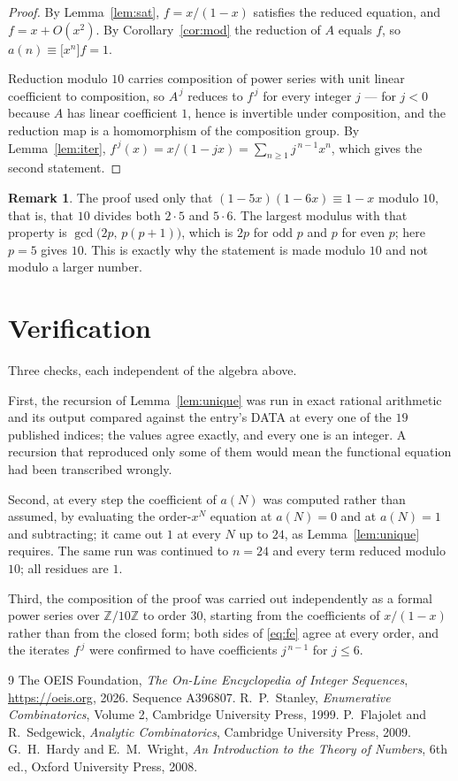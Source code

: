 \documentclass[11pt,a4paper]{article}
\theoremstyle{plain}
\theoremstyle{definition}
\newtheorem{remark}[theorem]{Remark}
\begin{document}
\begin{proof}
By Lemma~\ref{lem:sat}, $f=x/(1-x)$ satisfies the reduced equation, and $f=x+O(x^{2})$.
By Corollary~\ref{cor:mod} the reduction of $A$ equals $f$, so
$a(n)\equiv\bigl[x^{n}\bigr]f=1$.

Reduction modulo $10$ carries composition of power series with unit linear coefficient to
composition, so $A^{\,j}$ reduces to $f^{\,j}$ for every integer $j$ --- for $j<0$
because $A$ has linear coefficient $1$, hence is invertible under composition, and the
reduction map is a homomorphism of the composition group. By Lemma~\ref{lem:iter},
$f^{\,j}(x)=x/(1-jx)=\sum_{n\ge1}j^{\,n-1}x^{n}$, which gives the second statement.
\end{proof}

\begin{remark}
The proof used only that $(1-5x)(1-6x)\equiv1-x$ modulo $10$, that is, that
$10$ divides both $2\cdot5$ and $5\cdot6$. The largest modulus with that property
is $\gcd\bigl(2p,\,p(p+1)\bigr)$, which is $2p$ for odd $p$ and $p$ for even $p$; here
$p=5$ gives $10$. This is exactly why the statement is made modulo $10$ and not modulo
a larger number.
\end{remark}


\section{Verification}

Three checks, each independent of the algebra above.

First, the recursion of Lemma~\ref{lem:unique} was run in exact rational arithmetic and
its output compared against the entry's DATA at every one of the $19$ published
indices; the values agree exactly, and every one is an integer. A recursion that reproduced
only some of them would mean the functional equation had been transcribed wrongly.

Second, at every step the coefficient of $a(N)$ was computed rather than assumed, by
evaluating the order-$x^{N}$ equation at $a(N)=0$ and at $a(N)=1$ and subtracting; it came
out $1$ at every $N$ up to $24$, as Lemma~\ref{lem:unique} requires. The same run was
continued to $n=24$ and every term reduced modulo $10$; all residues are
$1$.

Third, the composition of the proof was carried out independently as a formal power series
over $\mathbb{Z}/10\mathbb{Z}$ to order $30$, starting from the coefficients of $x/(1-x)$
rather than from the closed form; both sides of \eqref{eq:fe} agree at every order, and the
iterates $f^{\,j}$ were confirmed to have coefficients $j^{\,n-1}$ for $j\le6$.

\begin{thebibliography}{9}
 The OEIS Foundation, \emph{The On-Line Encyclopedia of Integer
Sequences}, \url{https://oeis.org}, 2026. Sequence A396807.
 R.~P.~Stanley, \emph{Enumerative Combinatorics}, Volume 2, Cambridge
University Press, 1999.
 P.~Flajolet and R.~Sedgewick, \emph{Analytic Combinatorics}, Cambridge
University Press, 2009.
 G.~H.~Hardy and E.~M.~Wright, \emph{An Introduction to the Theory of
Numbers}, 6th ed., Oxford University Press, 2008.
\end{thebibliography}
\end{document}
